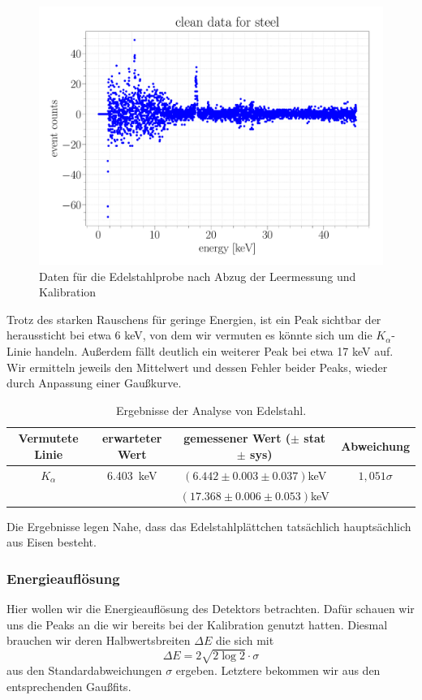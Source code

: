 \documentclass[a4paper,14pt]{article}
\begin{document}
\begin{figure}[H]
\centering
\includegraphics[scale=0.25]{../Figures/am_fe_clean.pdf}
\caption{Daten für die Edelstahlprobe nach Abzug der Leermessung und Kalibration}
\label{resolution}
\end{figure}

Trotz des starken Rauschens für geringe Energien, ist ein Peak sichtbar der heraussticht bei etwa 6 keV, von dem wir vermuten es könnte sich um die $K_\alpha$-Linie handeln. Außerdem fällt deutlich ein weiterer Peak bei etwa 17 keV auf. Wir ermitteln jeweils den Mittelwert und dessen Fehler beider Peaks, wieder durch Anpassung einer Gaußkurve.

\begin{table}[H]
	\renewcommand{\arraystretch}{1.5}
	\centering
	\begin{tabular}{|c|c|c|c|}
		\hline
		Vermutete Linie & erwarteter Wert & gemessener Wert ($\pm$ stat $\pm$ sys) & Abweichung \\
		\hline
		$K_\alpha$ & \SI{6.403}{keV} & $(6.442 \pm 0.003 \pm 0.037)$keV & $1,051\sigma$ \\
		\cline{1-4}
		 & & $(17.368 \pm 0.006 \pm 0.053)$keV & \\
		\hline
	\end{tabular}
	\caption{Ergebnisse der Analyse von Edelstahl.}
	\label{tab:am_fe_mean}
\end{table}

Die Ergebnisse legen Nahe, dass das Edelstahlplättchen tatsächlich hauptsächlich aus Eisen besteht.

\subsubsection{Energieauflösung}
Hier wollen wir die Energieauflösung des Detektors betrachten. Dafür schauen wir uns die Peaks an die wir bereits bei der Kalibration genutzt hatten. Diesmal brauchen wir deren Halbwertsbreiten $\Delta E$ die sich mit
\begin{equation}
	\Delta E = 2 \sqrt{2 \log2} \cdot \sigma
\end{equation}
aus den Standardabweichungen $\sigma$ ergeben. Letztere bekommen wir aus den entsprechenden Gaußfits.
\end{document}
